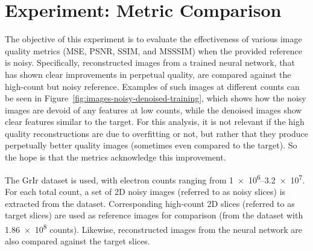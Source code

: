 \FloatBarrier
\section{Experiment: Metric Comparison}\label{sec:metric_comparison_experiment}

The objective of this experiment is to evaluate the effectiveness of various image quality metrics (\gls{MSE}, \gls{PSNR}, \gls{SSIM}, and \gls{MSSSIM}) when the provided reference is noisy. Specifically, reconstructed images from a trained neural network, that has shown clear improvements in perpetual  quality, are compared against the high-count but noisy reference. Examples of such images at different counts can be seen in Figure~\ref{fig:images-noisy-denoised-training}, which shows how the noisy images are devoid of any features at low counts, while the denoised images show clear features similar to the target. For this analysis, it is not relevant if the high quality reconstructions are due to overfitting or not, but rather that they produce perpetually better quality images (sometimes even compared to the target). So the hope is that the metrics acknowledge this improvement.


The \gls{GrIr} dataset is used, with electron counts ranging from \numrange{1e6}{3.2e7}. For each total count, a set of 2D noisy images (referred to as noisy slices) is extracted from the dataset. Corresponding high-count 2D slices (referred to as target slices) are used as reference images for comparison (from the dataset with \num{1.86e8} counts). Likewise, reconstructed images from the neural network are also compared against the target slices.


